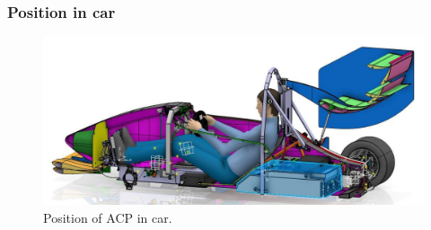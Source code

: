 \subsubsection{Position in car}

\begin{figure}[H]
	\centering
	\includegraphics[width=\textwidth]{./img/acp-position.jpg}
	\caption{Position of ACP in car.}
	\label{fig:ACP-position}
\end{figure}





